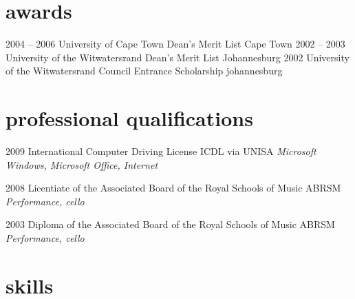 \documentclass[]{friggeri-cv} %
\begin{document}
\section{awards}

\begin{entrylist}
\entry
{2004 -- 2006}
{University of Cape Town Dean's Merit List}
{Cape Town}
{}
\entry
{2002 -- 2003}
{University of the Witwatersrand Dean's Merit List}
{Johannesburg}
{}
\entry
{2002}
{University of the Witwatersrand Council Entrance Scholarship}
{johannesburg}
{}
\end{entrylist}
\pagebreak

\section{professional qualifications}

\begin{entrylist}
\entry
{2009}
{International Computer Driving License}
{ICDL via UNISA}
{\emph{Microsoft Windows, Microsoft Office, Internet}}

\entry
{2008}
{Licentiate of the Associated Board of the Royal Schools of Music}
{ABRSM}
{\emph{Performance, cello}}

\entry
{2003}
{Diploma of the Associated Board of the Royal Schools of Music}
{ABRSM}
{\emph{Performance, cello}}

\end{entrylist}


\section{skills}
\end{document}
